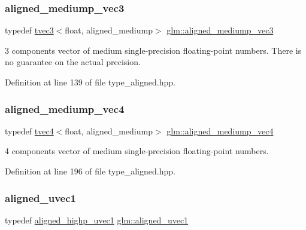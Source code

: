 \subsubsection{\texorpdfstring{aligned\_mediump\_vec3}{aligned\_mediump\_vec3}}
{\footnotesize\ttfamily typedef \mbox{\hyperlink{structglm_1_1tvec3}{tvec3}}$<$float, aligned\+\_\+mediump$>$ \mbox{\hyperlink{group__gtc__type__aligned_ga26e1bf19f9506f2b36949687d927fe63}{glm\+::aligned\+\_\+mediump\+\_\+vec3}}}

3 components vector of medium single-\/precision floating-\/point numbers. There is no guarantee on the actual precision. 

Definition at line 139 of file type\+\_\+aligned.\+hpp.

\mbox{\label{group__gtc__type__aligned_ga4c09f5d9e1a7fa59a9bc9eef1adef368}} 
\subsubsection{\texorpdfstring{aligned\_mediump\_vec4}{aligned\_mediump\_vec4}}
{\footnotesize\ttfamily typedef \mbox{\hyperlink{structglm_1_1tvec4}{tvec4}}$<$float, aligned\+\_\+mediump$>$ \mbox{\hyperlink{group__gtc__type__aligned_ga4c09f5d9e1a7fa59a9bc9eef1adef368}{glm\+::aligned\+\_\+mediump\+\_\+vec4}}}



4 components vector of medium single-\/precision floating-\/point numbers. 



Definition at line 196 of file type\+\_\+aligned.\+hpp.

\mbox{\label{group__gtc__type__aligned_gab0fbe9830a7129d9135b558b30eed930}} 
\subsubsection{\texorpdfstring{aligned\_uvec1}{aligned\_uvec1}}
{\footnotesize\ttfamily typedef \mbox{\hyperlink{group__gtc__type__aligned_ga14fec93434c0b98ff5318e49a1ae9185}{aligned\+\_\+highp\+\_\+uvec1}} \mbox{\hyperlink{group__gtc__type__aligned_gab0fbe9830a7129d9135b558b30eed930}{glm\+::aligned\+\_\+uvec1}}}



